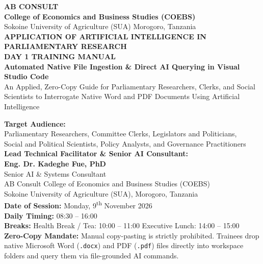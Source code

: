 \documentclass[11pt, a4paper]{report}
\begin{document}
\begin{titlepage}
    \centering
    \vspace*{0.5cm}
    
    {\LARGE \textbf{\textcolor{tanzaniablue}{AB CONSULT}}}\\[0.2cm]
    {\large \textbf{College of Economics and Business Studies (COEBS)}}\\[0.15cm]
    {\normalsize Sokoine University of Agriculture (SUA) \textbullet{} Morogoro, Tanzania}\\[1.2cm]
    
    {\LARGE \textbf{\textcolor{suagreen}{APPLICATION OF ARTIFICIAL INTELLIGENCE IN PARLIAMENTARY RESEARCH}}}\\[0.4cm]
    {\Huge \textbf{DAY 1 TRAINING MANUAL}}\\[0.4cm]
    {\Large \textbf{Automated Native File Ingestion \& Direct AI Querying in Visual Studio Code}}\\[0.25cm]
    {\large An Applied, Zero-Copy Guide for Parliamentary Researchers, Clerks, and Social Scientists to Interrogate Native Word and PDF Documents Using Artificial Intelligence}\\[1.2cm]
    
    \begin{minipage}{0.92\textwidth}
        \centering
        \textbf{Target Audience:}\\
        Parliamentary Researchers, Committee Clerks, Legislators and Politicians,\\
        Social and Political Scientists, Policy Analysts, and Governance Practitioners\\[0.6cm]
        
        \textbf{Lead Technical Facilitator \& Senior AI Consultant:}\\
        \textbf{\Large Eng. Dr. Kadeghe Fue, PhD}\\
        Senior AI \& Systems Consultant\\
        AB Consult \textbullet{} College of Economics and Business Studies (COEBS)\\
        Sokoine University of Agriculture (SUA), Morogoro, Tanzania\\[0.6cm]
        
        \textbf{Date of Session:} Monday, 9\textsuperscript{th} November 2026\\
        \textbf{Daily Timing:} 08:30 -- 16:00\\
        \textbf{Breaks:} Health Break / Tea: 10:00 -- 11:00 \textbar{} Executive Lunch: 14:00 -- 15:00\\
        \textbf{Zero-Copy Mandate:} Manual copy-pasting is strictly prohibited. Trainees drop native Microsoft Word (\texttt{.docx}) and PDF (\texttt{.pdf}) files directly into workspace folders and query them via file-grounded AI commands.
    \end{minipage}
    

\end{titlepage}
\end{document}

